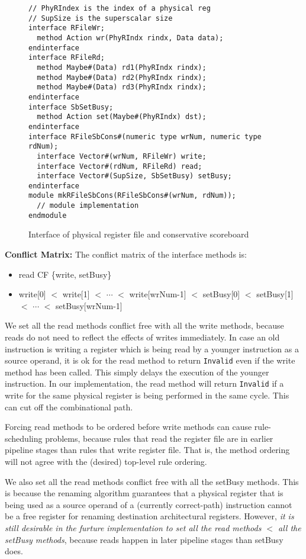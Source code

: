 \begin{figure}
\begin{lstlisting}[caption={}]
// PhyRIndex is the index of a physical reg
// SupSize is the superscalar size
interface RFileWr;
  method Action wr(PhyRIndx rindx, Data data);
endinterface
interface RFileRd;
  method Maybe#(Data) rd1(PhyRIndx rindx);
  method Maybe#(Data) rd2(PhyRIndx rindx);
  method Maybe#(Data) rd3(PhyRIndx rindx);
endinterface
interface SbSetBusy;
  method Action set(Maybe#(PhyRIndx) dst);
endinterface
interface RFileSbCons#(numeric type wrNum, numeric type rdNum);
  interface Vector#(wrNum, RFileWr) write;
  interface Vector#(rdNum, RFileRd) read;
  interface Vector#(SupSize, SbSetBusy) setBusy;
endinterface
module mkRFileSbCons(RFileSbCons#(wrNum, rdNum));
  // module implementation
endmodule
\end{lstlisting}
\caption{Interface of physical register file and conservative scoreboard}\label{fig:prf-sb-ifc}
\end{figure}

\noindent\textbf{Conflict Matrix:}
The conflict matrix of the interface methods is:
\begin{itemize}
    \item read CF \{write, setBusy\}
    \item write[0] $<$ write[1] $<$ $\cdots$ $<$ write[wrNum-1] $<$ setBusy[0] $<$ setBusy[1] $<$ $\cdots$ $<$ setBusy[wrNum-1]
\end{itemize}
We set all the read methods conflict free with all the write methods, because reads do not need to reflect the effects of writes immediately.
In case an old instruction is writing a register which is being read by a younger instruction as a source operand, it is ok for the read method to return \texttt{Invalid} even if the write method has been called.
This simply delays the execution of the younger instruction.
In our implementation, the read method will return \texttt{Invalid} if a write for the same physical register is being performed in the same cycle.
This can cut off the combinational path.

Forcing read methods to be ordered before write methods can cause rule-scheduling problems, because rules that read the register file are in earlier pipeline stages than rules that write register file.
That is, the method ordering will not agree with the (desired) top-level rule ordering.

We also set all the read methods conflict free with all the setBusy methods.
This is because the renaming algorithm guarantees that a physical register that is being used as a source operand of a (currently correct-path) instruction cannot be a free register for renaming destination architectural registers.
However, \emph{it is still desirable in the furture implementation to set all the read methods $<$ all the setBusy methods}, because reads happen in later pipeline stages than setBusy does.

